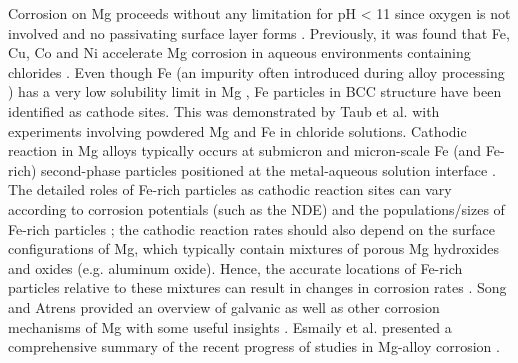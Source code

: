 Corrosion on Mg proceeds without any limitation for pH < 11 since oxygen is not involved and no passivating surface layer forms \cite{liu2016controlling,ralston2012effect}. Previously, it was found that Fe, Cu, Co and Ni accelerate Mg corrosion in aqueous environments containing chlorides \cite{hanawalt1942corrosion, mcnulty1942some}. Even though Fe (an impurity often introduced during alloy processing \cite{yang2015corrosion, scharf2007iron}) has a very low solubility limit in Mg \cite{mcnulty1942some}, Fe particles in \ac{BCC} structure have been identified as cathode sites. This was demonstrated by Taub et al. \cite{taub2002mechanism} with experiments involving powdered Mg and Fe in chloride solutions. Cathodic reaction in Mg alloys typically occurs at submicron and micron-scale Fe (and Fe-rich) second-phase particles positioned at the metal-aqueous solution interface \cite{yang2015corrosion, eaves2012inhibition}. The detailed roles of Fe-rich particles as cathodic reaction sites can vary according to corrosion potentials (such as the \ac{NDE}) and the populations/sizes of Fe-rich particles \cite{hoche2016effect, yang2018effect}; the cathodic reaction rates should also depend on the surface configurations of Mg, which typically contain mixtures of porous Mg hydroxides and oxides (e.g. aluminum oxide). Hence, the accurate locations of Fe-rich particles relative to these mixtures can result in changes in corrosion rates \cite{taheri2012analysis, taheri2014towards}. Song and Atrens provided an overview of galvanic as well as other corrosion mechanisms of Mg with some useful insights \cite{song2003understanding}. Esmaily et al. presented a comprehensive summary of the recent progress of studies in Mg-alloy corrosion \cite{esmaily2017fundamentals}. 


